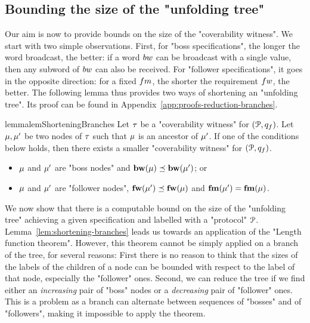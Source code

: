 \subsection{Bounding the size of the "unfolding tree"}
\label{sec:tree-bounds}

Our aim is now to provide bounds on the size of the "coverability witness". We start with two simple observations. First, for "boss specifications", the longer the word broadcast, the better: if a word $\bossspec$ can be broadcast with a single value, then any subword of $\bossspec$ can also be received. 
For "follower specifications", it goes in the opposite direction: for a fixed $\followmessagespec$, the shorter the requirement $\followwordspec$, the better. The following lemma thus provides two ways of shortening an "unfolding tree". Its proof can be found in Appendix~\ref{app:proofs-reduction-branches}.

\begin{restatable}{lemma}{lemShorteningBranches} 
\label{lem:shortening-branches}
	Let $\tau$ be a "coverability witness" for $(\mathcal{P}, q_f)$.
	Let $\mu, \mu'$ be two nodes of $\tau$ such that $\mu$ is an ancestor of $\mu'$. If one of the conditions below holds, then there exists a smaller "coverability witness" for $(\mathcal{P}, q_f)$.
	\begin{itemize}
	\item $\mu$ and $\mu'$ are "boss nodes" and $\mathbf{bw}(\mu) \preceq \mathbf{bw}(\mu')$; or
	\item $\mu$ and $\mu'$ are "follower nodes", $\mathbf{fw}(\mu') \preceq \mathbf{fw}(\mu)$ and $\mathbf{fm}(\mu')=\mathbf{fm}(\mu)$.
	\end{itemize} 
\end{restatable}


We now show that there is a computable bound on the size of the "unfolding tree" achieving a given specification and labelled with a "protocol" $\mathcal{P}$. Lemma~\ref{lem:shortening-branches} leads us towards an application of the "Length function theorem". 
However, this theorem cannot be simply applied on a branch of the tree, for several reasons: First there is no reason to think that the sizes of the labels of the children of a node can be bounded with respect to the label of that node, especially the "follower" ones.  Second, we can reduce the tree if we find either an \emph{increasing} pair of "boss" nodes or a \emph{decreasing} pair of "follower" ones. This is a problem as a branch can alternate between sequences of "bosses" and of "followers", making it impossible to apply the theorem.


